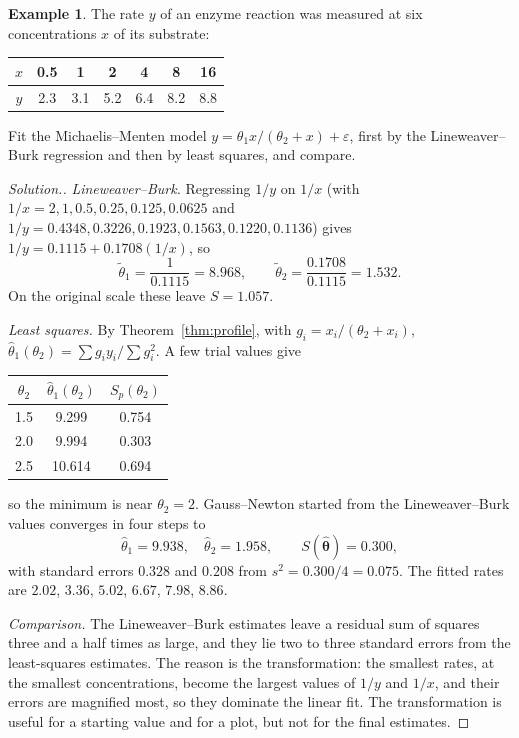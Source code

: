 \documentclass[11pt,a4paper]{article}
\numberwithin{equation}{section}
\theoremstyle{definition}
\newtheorem{exa}[thm]{Example}
\newenvironment{solution}
  {\renewcommand{\qedsymbol}{}\begin{proof}[\textit{Solution}.]}
  {\end{proof}}
\begin{document}
\begin{exa}\label{exa:enzyme}
The rate $y$ of an enzyme reaction was measured at six concentrations $x$ of its substrate:
\begin{center}
\begin{tabular}{c|cccccc}
$x$ & 0.5 & 1 & 2 & 4 & 8 & 16 \\
\hline
$y$ & 2.3 & 3.1 & 5.2 & 6.4 & 8.2 & 8.8 \\
\end{tabular}
\end{center}
Fit the Michaelis--Menten model $y = \theta_1x/(\theta_2 + x) + \varepsilon$, first by the Lineweaver--Burk regression and then by least
squares, and compare.
\end{exa}

\begin{solution}
\emph{Lineweaver--Burk.} Regressing $1/y$ on $1/x$ (with $1/x = 2, 1, 0.5, 0.25, 0.125, 0.0625$ and
$1/y = 0.4348, 0.3226, 0.1923, 0.1563, 0.1220, 0.1136$) gives $1/y = 0.1115 + 0.1708(1/x)$, so
\[
\tilde\theta_1 = \frac{1}{0.1115} = 8.968, \qquad \tilde\theta_2 = \frac{0.1708}{0.1115} = 1.532 .
\]
On the original scale these leave $S = 1.057$.

\emph{Least squares.} By Theorem~\ref{thm:profile}, with $g_i = x_i/(\theta_2 + x_i)$,
$\hat\theta_1(\theta_2) = \sum g_iy_i/\sum g_i^2$. A few trial values give
\begin{center}
\begin{tabular}{ccc}
$\theta_2$ & $\hat\theta_1(\theta_2)$ & $S_p(\theta_2)$ \\
\hline
1.5 & 9.299 & 0.754 \\
2.0 & 9.994 & 0.303 \\
2.5 & 10.614 & 0.694 \\
\end{tabular}
\end{center}
so the minimum is near $\theta_2 = 2$. Gauss--Newton started from the Lineweaver--Burk values converges in four
steps to
\[
\hat\theta_1 = 9.938, \quad \hat\theta_2 = 1.958, \qquad S(\hat{\boldsymbol\theta}) = 0.300 ,
\]
with standard errors $0.328$ and $0.208$ from $s^2 = 0.300/4 = 0.075$. The fitted rates are $2.02$, $3.36$, $5.02$, $6.67$, $7.98$, $8.86$.

\emph{Comparison.} The Lineweaver--Burk estimates leave a residual sum of squares three and a half times as
large, and they lie two to three standard errors from the least-squares estimates. The reason is the
transformation: the smallest rates, at the smallest concentrations, become the largest values of $1/y$ and
$1/x$, and their errors are magnified most, so they dominate the linear fit. The transformation is useful
for a starting value and for a plot, but not for the final estimates.
\end{solution}
\end{document}
